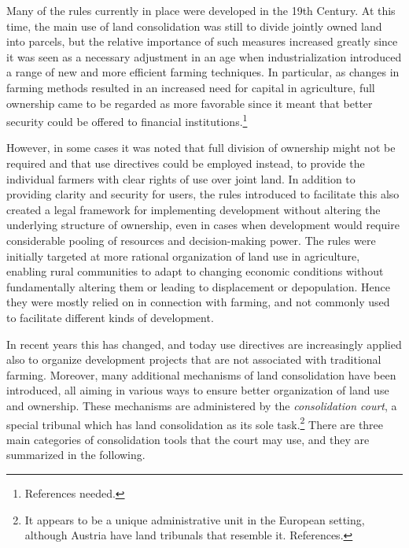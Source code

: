 Many of the rules currently in place were developed in the 19th Century. At this time, the main use of land consolidation was still to divide jointly owned land into parcels, but the relative importance of such measures increased greatly since it was seen as a necessary adjustment in an age when industrialization introduced a range of new and more efficient farming techniques. In particular, as changes in farming methods resulted in an increased need for capital in agriculture, full ownership came to be regarded as more favorable since it meant that better security could be offered to financial institutions.\footnote{References needed.} 

However, in some cases it was noted that full division of ownership might not be required and that use directives could be employed instead, to provide the individual farmers with clear rights of use over joint land. In addition to providing clarity and security for users, the rules introduced to facilitate this also created a legal framework for implementing development without altering the underlying structure of ownership, even in cases when development would require considerable pooling of resources and decision-making power. The rules were initially targeted at more rational organization of land use in agriculture, enabling rural communities to adapt to changing economic conditions without fundamentally altering them or leading to displacement or depopulation. Hence they were mostly relied on in connection with farming, and not commonly used to facilitate different kinds of development.

In recent years this has changed, and today use directives are increasingly applied also to organize development projects that are not associated with traditional farming. Moreover, many additional mechanisms of land consolidation have been introduced, all aiming in various ways to ensure better organization of land use and ownership. These mechanisms are administered by the \emph{consolidation court}, a special tribunal which has land consolidation as its sole task.\footnote{It appears to be a unique administrative unit in the European setting, although Austria have land tribunals that resemble it. References.} There are three main categories of consolidation tools that the court may use, and they are summarized in the following.

